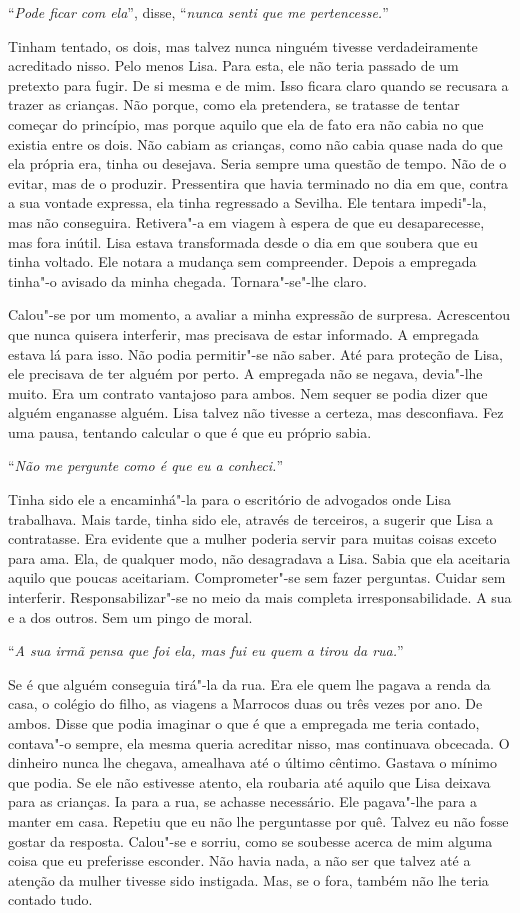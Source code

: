 ``\emph{Pode ficar com ela}'',
disse,
``\emph{nunca senti que me pertencesse.}''

Tinham tentado, os dois, mas talvez nunca ninguém tivesse
verdadeiramente acreditado nisso. Pelo menos Lisa. Para esta, ele não
teria passado de um pretexto para fugir. De si mesma e de mim. Isso
ficara claro quando se recusara a trazer as crianças. Não porque, como
ela pretendera, se tratasse de tentar começar do princípio, mas porque
aquilo que ela de fato era não cabia no que existia entre os dois. Não
cabiam as crianças, como não cabia quase nada do que ela própria era,
tinha ou desejava. Seria sempre uma questão de tempo. Não de o evitar,
mas de o produzir. Pressentira que havia terminado no dia em que, contra
a sua vontade expressa, ela tinha regressado a Sevilha. Ele tentara
impedi"-la, mas não conseguira. Retivera"-a em viagem à espera de que eu
desaparecesse, mas fora inútil. Lisa estava transformada desde o dia em
que soubera que eu tinha voltado. Ele notara a mudança sem compreender.
Depois a empregada tinha"-o avisado da minha chegada. Tornara"-se"-lhe
claro.

Calou"-se por um momento, a avaliar a minha expressão de surpresa.
Acrescentou que nunca quisera interferir, mas precisava de estar
informado. A empregada estava lá para isso. Não podia permitir"-se não
saber. Até para proteção de Lisa, ele precisava de ter alguém por
perto. A empregada não se negava, devia"-lhe muito. Era um contrato
vantajoso para ambos. Nem sequer se podia dizer que alguém enganasse
alguém. Lisa talvez não tivesse a certeza, mas desconfiava. Fez uma
pausa, tentando calcular o que é que eu próprio sabia.

``\emph{Não me pergunte como é que eu a conheci.}''

Tinha sido ele a encaminhá"-la para o escritório de advogados onde Lisa
trabalhava. Mais tarde, tinha sido ele, através de terceiros, a sugerir
que Lisa a contratasse. Era evidente que a mulher poderia servir para
muitas coisas exceto para ama. Ela, de qualquer modo, não desagradava a
Lisa. Sabia que ela aceitaria aquilo que poucas aceitariam.
Comprometer"-se sem fazer perguntas. Cuidar sem interferir.
Responsabilizar"-se no meio da mais completa irresponsabilidade. A sua e
a dos outros. Sem um pingo de moral.

``\emph{A sua irmã pensa que foi ela, mas fui eu quem a tirou da rua.}''

Se é que alguém conseguia tirá"-la da rua. Era ele quem lhe pagava a
renda da casa, o colégio do filho, as viagens a Marrocos duas ou três
vezes por ano. De ambos. Disse que podia imaginar o que é que a
empregada me teria contado, contava"-o sempre, ela mesma queria
acreditar nisso, mas continuava obcecada. O dinheiro nunca lhe chegava,
amealhava até o último cêntimo. Gastava o mínimo que podia. Se ele não
estivesse atento, ela roubaria até aquilo que Lisa deixava para as
crianças. Ia para a rua, se achasse necessário. Ele pagava"-lhe para a
manter em casa. Repetiu que eu não lhe perguntasse por quê. Talvez eu não
fosse gostar da resposta. Calou"-se e sorriu, como se soubesse acerca de
mim alguma coisa que eu preferisse esconder. Não havia nada, a não ser
que talvez até a atenção da mulher tivesse sido instigada. Mas, se o
fora, também não lhe teria contado tudo.

